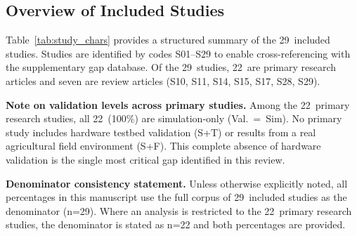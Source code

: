 \documentclass[review,3p]{elsarticle}
\begin{document}
\subsection{Overview of Included Studies}
\label{subsec:overview}

Table~\ref{tab:study_chars} provides a structured summary of the 29~included
studies. Studies are identified by codes S01--S29 to enable cross-referencing
with the supplementary gap database. Of the 29~studies, 22~are primary research
articles and seven are review articles (S10, S11, S14, S15, S17, S28, S29).

\textbf{Note on validation levels across primary studies.} Among the
22~primary research studies, all 22~(100\%) are simulation-only
(Val.~=~Sim). No primary study includes hardware testbed validation (S+T)
or results from a real agricultural field environment (S+F). This
complete absence of hardware validation is the single most critical gap
identified in this review.

\textbf{Denominator consistency statement.} Unless otherwise explicitly noted,
all percentages in this manuscript use the full corpus of 29~included studies
as the denominator (n=29). Where an analysis is restricted to the 22~primary
research studies, the denominator is stated as n=22 and both percentages are
provided.
\end{document}
